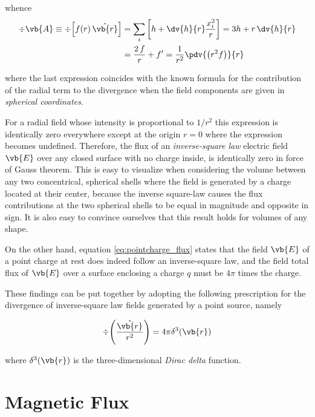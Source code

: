 whence 
\begin{equation}
\begin{aligned} 
\div{\vb{A}} \equiv \div{\left[ f(r) \, \hat{\vb{r}} \right]} &= 
\sum\limits_i{ \left[ h + \dv{h}{r} \frac{x_i^2}{r} \right]} = 3h + r \, \dv{h}{r}  \\
&= \frac{2 \, f}{r} + f' = \frac{1}{r^2} \pdv{\left( r^2 f \right) }{r}
\label{eq:radialfields_divergence_B}
\end{aligned}
\end{equation}

where the last expression coincides with the known formula for the contribution of the radial term to the divergence when the field components are given in \textit{spherical coordinates}. 

For a radial field whose intensity is proportional to $1/r^2$ this expression is identically zero everywhere except at the origin $r=0$ where the expression becomes undefined. Therefore, the flux of an \textit{inverse-square law} electric field $\vb{E}$ over any closed surface with no charge inside, is identically zero in force of Gauss theorem. This is easy to visualize when considering the volume between any two concentrical, spherical shells where the field is generated by a charge located at their center, because the inverse square-law causes the flux contributions at the two spherical shells to be equal in magnitude and opposite in sign. It is also easy to convince ourselves that this result holds for volumes of any shape. 

On the other hand, equation \ref{eq:pointcharge_flux} states that the field $\vb{E}$ of a point charge at rest does indeed follow an inverse-square law, and the field total flux of $\vb{E}$ over a surface enclosing a charge $q$ must be $4\pi$ times the charge.

These findings can be put together by adopting the following prescription for the divergence of inverse-square law fields generated by a point source, namely 

\begin{equation}
\div{\left( \frac{\hat{\vb{r}}}{r^2}\right)} = 4 \pi \delta^{3}(\vb{r}) 
\label{eq:pointcharge_div}
\end{equation}

where $\delta^{3}(\vb{r})$ is the three-dimensional \textit{Dirac delta} function.

\section{Magnetic Flux}

